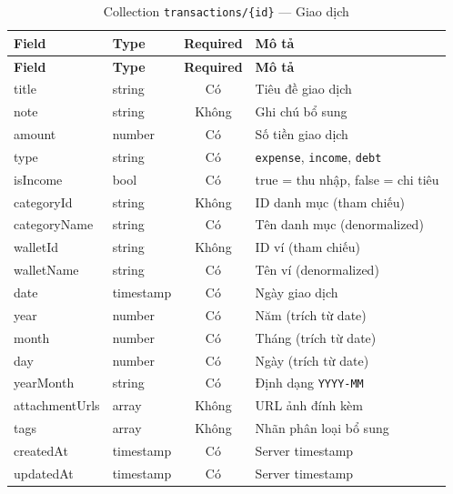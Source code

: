 \begin{longtable}{|l|l|c|p{6cm}|}
\caption{Collection \texttt{transactions/\{id\}} --- Giao dịch} \\
\hline
\textbf{Field} & \textbf{Type} & \textbf{Required} & \textbf{Mô tả} \\
\hline
\endfirsthead
\hline
\textbf{Field} & \textbf{Type} & \textbf{Required} & \textbf{Mô tả} \\
\hline
\endhead
title & string & Có & Tiêu đề giao dịch \\
\hline
note & string & Không & Ghi chú bổ sung \\
\hline
amount & number & Có & Số tiền giao dịch \\
\hline
type & string & Có & \texttt{expense}, \texttt{income}, \texttt{debt} \\
\hline
isIncome & bool & Có & true = thu nhập, false = chi tiêu \\
\hline
categoryId & string & Không & ID danh mục (tham chiếu) \\
\hline
categoryName & string & Có & Tên danh mục (denormalized) \\
\hline
walletId & string & Không & ID ví (tham chiếu) \\
\hline
walletName & string & Có & Tên ví (denormalized) \\
\hline
date & timestamp & Có & Ngày giao dịch \\
\hline
year & number & Có & Năm (trích từ date) \\
\hline
month & number & Có & Tháng (trích từ date) \\
\hline
day & number & Có & Ngày (trích từ date) \\
\hline
yearMonth & string & Có & Định dạng \texttt{YYYY-MM} \\
\hline
attachmentUrls & array & Không & URL ảnh đính kèm \\
\hline
tags & array & Không & Nhãn phân loại bổ sung \\
\hline
createdAt & timestamp & Có & Server timestamp \\
\hline
updatedAt & timestamp & Có & Server timestamp \\
\hline
\end{longtable}

